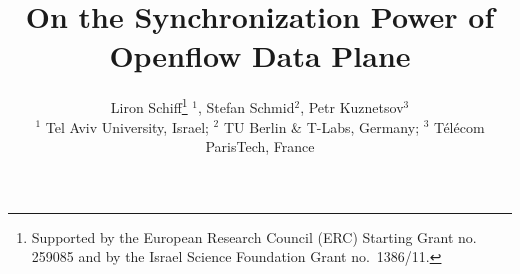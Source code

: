 \documentclass[conference]{sigcomm-alternate}
\begin{document}
\sloppy





\title{On the Synchronization Power of Openflow Data Plane} 




\author{
Liron Schiff\thanks{Supported by the European Research Council (ERC) Starting Grant no. 259085 and by the Israel Science Foundation Grant no.~1386/11.} $^1$,
Stefan Schmid$^2$, Petr Kuznetsov$^3$ \\
\small $^1$ Tel Aviv University, Israel; $^2$ TU Berlin \& T-Labs,
Germany; $^3$ T\'el\'ecom ParisTech, France
}


\date{}


\maketitle


\thispagestyle{empty}


\end{document}
